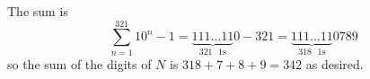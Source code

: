 The sum is \[\displaystyle\sum_{n=1}^{321}10^n-1=\underbrace{111\ldots11}_{321\text{ }1\text{s}}0-321=\underbrace{111\ldots11}_{318\text{ }1\text{s}}0789\] so the sum of the digits of $N$ is $318+7+8+9=\boxed{342}$ as desired.